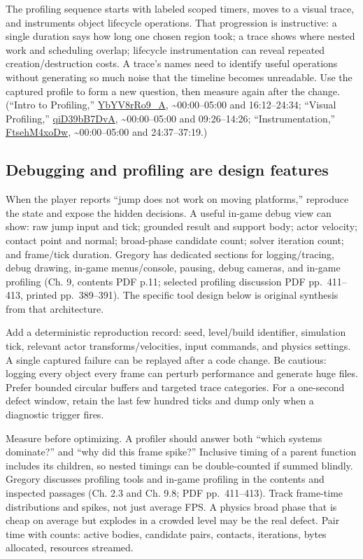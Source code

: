 The profiling sequence starts with labeled scoped timers, moves to a visual trace, and instruments object lifecycle operations. That progression is instructive: a single duration says how long one chosen region took; a trace shows where nested work and scheduling overlap; lifecycle instrumentation can reveal repeated creation/destruction costs. A trace's names need to identify useful operations without generating so much noise that the timeline becomes unreadable. Use the captured profile to form a new question, then measure again after the change. (``Intro to Profiling,'' \href{https://www.youtube.com/watch?v=YbYV8rRo9_A}{YbYV8rRo9\_A}, \textasciitilde00:00--05:00 and 16:12--24:34; ``Visual Profiling,'' \href{https://www.youtube.com/watch?v=qiD39bB7DvA}{qiD39bB7DvA}, \textasciitilde00:00--05:00 and 09:26--14:26; ``Instrumentation,'' \href{https://www.youtube.com/watch?v=FtsehM4xoDw}{FtsehM4xoDw}, \textasciitilde00:00--05:00 and 24:37--37:19.)

\subsection{Debugging and profiling are design features}\label{06-engine-ii-ch041-debugging-and-profiling-are-design-features}

When the player reports ``jump does not work on moving platforms,'' reproduce the state and expose the hidden decisions. A useful in-game debug view can show: raw jump input and tick; grounded result and support body; actor velocity; contact point and normal; broad-phase candidate count; solver iteration count; and frame/tick duration. Gregory has dedicated sections for logging/tracing, debug drawing, in-game menus/console, pausing, debug cameras, and in-game profiling (Ch. 9, contents PDF p.11; selected profiling discussion PDF pp.~411--413, printed pp.~389--391). The specific tool design below is original synthesis from that architecture.

Add a deterministic reproduction record: seed, level/build identifier, simulation tick, relevant actor transforms/velocities, input commands, and physics settings. A single captured failure can be replayed after a code change. Be cautious: logging every object every frame can perturb performance and generate huge files. Prefer bounded circular buffers and targeted trace categories. For a one-second defect window, retain the last few hundred ticks and dump only when a diagnostic trigger fires.

Measure before optimizing. A profiler should answer both ``which systems dominate?'' and ``why did this frame spike?'' Inclusive timing of a parent function includes its children, so nested timings can be double-counted if summed blindly. Gregory discusses profiling tools and in-game profiling in the contents and inspected passages (Ch. 2.3 and Ch. 9.8; PDF pp.~411--413). Track frame-time distributions and spikes, not just average FPS. A physics broad phase that is cheap on average but explodes in a crowded level may be the real defect. Pair time with counts: active bodies, candidate pairs, contacts, iterations, bytes allocated, resources streamed.

